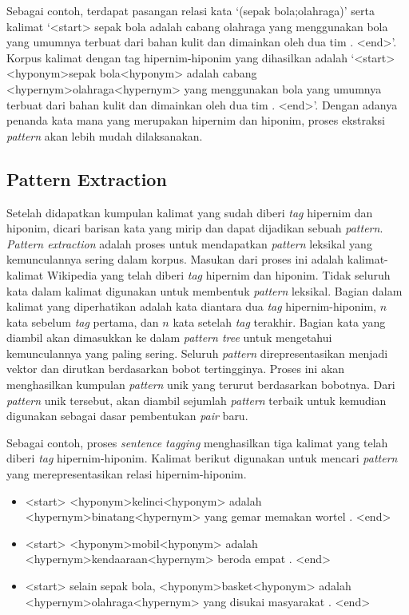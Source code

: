 Sebagai contoh, terdapat pasangan relasi kata `(sepak bola;olahraga)' serta kalimat `<start> sepak bola adalah cabang olahraga yang menggunakan bola yang umumnya terbuat dari bahan kulit dan dimainkan oleh dua tim . <end>'. Korpus kalimat dengan tag hipernim-hiponim yang dihasilkan adalah `<start> <hyponym>sepak bola<hyponym> adalah cabang <hypernym>olahraga<hypernym> yang menggunakan bola yang umumnya terbuat dari bahan kulit dan dimainkan oleh dua tim . <end>'. Dengan adanya penanda kata mana yang merupakan hipernim dan hiponim, proses ekstraksi \textit{pattern} akan lebih mudah dilaksanakan.

\subsection{Pattern Extraction}
Setelah didapatkan kumpulan kalimat yang sudah diberi \textit{tag} hipernim dan hiponim, dicari barisan kata yang mirip dan dapat dijadikan sebuah \textit{pattern}. \textit{Pattern extraction} adalah proses untuk mendapatkan \textit{pattern} leksikal yang kemunculannya sering dalam korpus. Masukan dari proses ini adalah kalimat-kalimat Wikipedia yang telah diberi \textit{tag} hipernim dan hiponim. Tidak seluruh kata dalam kalimat digunakan untuk membentuk \textit{pattern} leksikal. Bagian dalam kalimat yang diperhatikan adalah kata diantara dua \textit{tag} hipernim-hiponim, $n$ kata sebelum \textit{tag} pertama, dan $n$ kata setelah \textit{tag} terakhir. Bagian kata yang diambil akan dimasukkan ke dalam \textit{pattern tree} untuk mengetahui kemunculannya yang paling sering. Seluruh \textit{pattern} direpresentasikan menjadi vektor dan dirutkan berdasarkan bobot tertingginya. Proses ini akan menghasilkan kumpulan \textit{pattern} unik yang terurut berdasarkan bobotnya. Dari \textit{pattern} unik tersebut, akan diambil sejumlah \textit{pattern} terbaik untuk kemudian digunakan sebagai dasar pembentukan \textit{pair} baru.

Sebagai contoh, proses \textit{sentence tagging} menghasilkan tiga kalimat yang telah diberi \textit{tag} hipernim-hiponim. Kalimat berikut digunakan untuk mencari \textit{pattern} yang merepresentasikan relasi hipernim-hiponim.
\begin{itemize}
  \item <start> <hyponym>kelinci<hyponym> adalah <hypernym>binatang<hypernym> yang gemar memakan wortel . <end>
  \item <start> <hyponym>mobil<hyponym> adalah <hypernym>kendaaraan<hypernym> beroda empat . <end>
  \item <start> selain sepak bola, <hyponym>basket<hyponym> adalah <hypernym>olahraga<hypernym> yang disukai masyarakat . <end>
\end{itemize}

